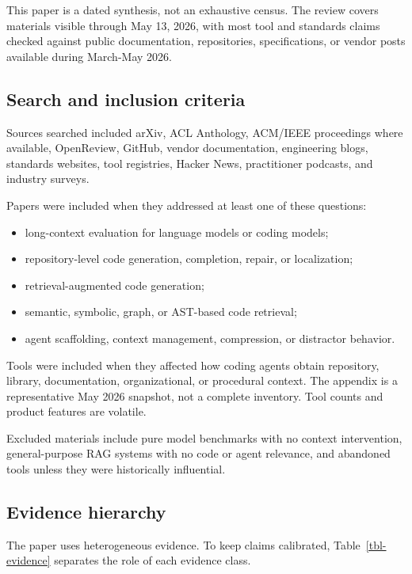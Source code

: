 \documentclass[
  11pt,
  letterpaper,
  numbers=noendperiod,
  parskip=half]{scrartcl}
\providecommand{\tightlist}{%
  \setlength{\itemsep}{0pt}\setlength{\parskip}{0pt}}
\begin{document}
This paper is a dated synthesis, not an exhaustive census. The review
covers materials visible through May 13, 2026, with most tool and
standards claims checked against public documentation, repositories,
specifications, or vendor posts available during March-May 2026.

\subsection{Search and inclusion criteria}\label{sec-method-search}

Sources searched included arXiv, ACL Anthology, ACM/IEEE proceedings
where available, OpenReview, GitHub, vendor documentation, engineering
blogs, standards websites, tool registries, Hacker News, practitioner
podcasts, and industry surveys.

Papers were included when they addressed at least one of these
questions:

\begin{itemize}
\tightlist
\item
  long-context evaluation for language models or coding models;
\item
  repository-level code generation, completion, repair, or localization;
\item
  retrieval-augmented code generation;
\item
  semantic, symbolic, graph, or AST-based code retrieval;
\item
  agent scaffolding, context management, compression, or distractor
  behavior.
\end{itemize}

Tools were included when they affected how coding agents obtain
repository, library, documentation, organizational, or procedural
context. The appendix is a representative May 2026 snapshot, not a
complete inventory. Tool counts and product features are volatile.

Excluded materials include pure model benchmarks with no context
intervention, general-purpose RAG systems with no code or agent
relevance, and abandoned tools unless they were historically
influential.

\subsection{Evidence hierarchy}\label{sec-evidence-hierarchy}

The paper uses heterogeneous evidence. To keep claims calibrated,
Table~\ref{tbl-evidence} separates the role of each evidence class.
\end{document}
